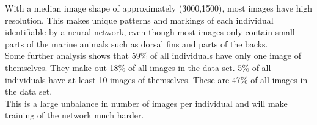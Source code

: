 \noindent With a median image shape of approximately (3000,1500), most images have high resolution. This makes unique patterns and markings of each individual identifiable by a neural network, even though most images only contain small parts of the marine animals such as dorsal fins and parts of the backs. \\
Some further analysis shows that 59\% of all individuals have only one image of themselves. They make out 18\% of all images in the data set.
5\% of all individuals have at least 10 images of themselves. These are 47\% of all images in the data set. \\
This is a large unbalance in number of images per individual and will make training of the network much harder.